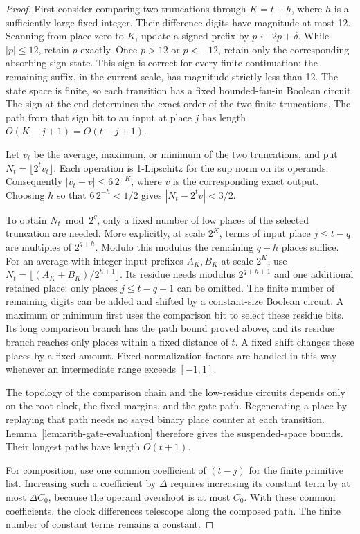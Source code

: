 \begin{proof}
First consider comparing two truncations through $K=t+h$, where $h$
is a sufficiently large fixed integer.  Their difference digits have
magnitude at most 12.  Scanning from place zero to $K$, update a signed
prefix by $p\leftarrow2p+\delta$.  While $|p|\leq12$, retain $p$
exactly.  Once $p>12$ or $p<-12$, retain only the corresponding
absorbing sign state.  This sign is correct for every finite
continuation: the remaining suffix, in the current scale, has
magnitude strictly less than 12.  The state space is finite, so each
transition has a fixed bounded-fan-in Boolean circuit.  The sign
at the end determines the exact order of the two finite truncations.
The path from that sign bit to an input at place $j$ has length
$O(K-j+1)=O(t-j+1)$.

Let $v_t$ be the average, maximum, or minimum of the two
truncations, and put $N_t=\lfloor2^tv_t\rfloor$.  Each operation is
1-Lipschitz for the sup norm on its operands.  Consequently
$|v_t-v|\leq6\,2^{-K}$, where $v$ is the corresponding exact output.
Choosing $h$ so that $6\,2^{-h}<1/2$ gives
$|N_t-2^tv|<3/2$.

To obtain $N_t\bmod2^q$, only a fixed number of low places of the
selected truncation are needed.  More explicitly, at scale $2^K$,
terms of input place $j\leq t-q$ are multiples of $2^{q+h}$.
Modulo this modulus the remaining $q+h$ places suffice.  For an
average with integer input prefixes $A_K,B_K$ at scale $2^K$,
use $N_t=\lfloor(A_K+B_K)/2^{h+1}\rfloor$.  Its residue needs
modulus $2^{q+h+1}$ and one additional retained place:
only places $j\leq t-q-1$ can be omitted.  The finite number
of remaining digits can be added and shifted by a constant-size
Boolean circuit.  A maximum or minimum first uses the comparison
bit to select these residue bits.  Its long comparison branch has
the path bound proved above, and its residue branch reaches only
places within a fixed distance of $t$.  A fixed shift changes these
places by a fixed amount.  Fixed normalization factors are handled
in this way whenever an intermediate range exceeds $[-1,1]$.

The topology of the comparison chain and the low-residue circuits
depends only on the root clock, the fixed margins, and the gate
path.  Regenerating a place by replaying that path needs no saved
binary place counter at each transition.  Lemma~\ref{lem:arith-gate-evaluation}
therefore gives the suspended-space bounds.  Their longest paths
have length $O(t+1)$.

For composition, use one common coefficient of $(t-j)$ for the
finite primitive list.  Increasing such a coefficient by $\Delta$
requires increasing its constant term by at most $\Delta C_0$,
because the operand overshoot is at most $C_0$.  With these common
coefficients, the clock differences telescope along the composed
path.  The finite number of constant terms remains a constant.
\end{proof}

